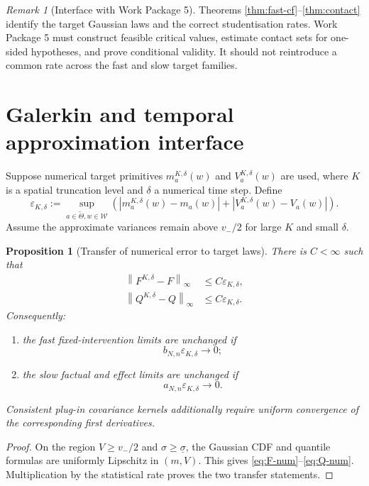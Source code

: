 \documentclass[11pt]{article}
\newtheorem{proposition}[assumption]{Proposition}
\theoremstyle{remark}
\newtheorem{remark}[assumption]{Remark}
\newcommand{\cW}{\mathcal W}
\newcommand{\norm}[1]{\left\lVert #1\right\rVert}
\newcommand{\abs}[1]{\left\lvert #1\right\rvert}
\newcommand{\an}{a_{N,n}}
\newcommand{\bn}{b_{N,n}}
\begin{document}
\begin{remark}[Interface with Work Package 5]
Theorems \ref{thm:fast-cf}--\ref{thm:contact} identify the target Gaussian laws and the correct studentisation rates.  Work Package 5 must construct feasible critical values, estimate contact sets for one-sided hypotheses, and prove conditional validity.  It should not reintroduce a common rate across the fast and slow target families.
\end{remark}

\section{Galerkin and temporal approximation interface}

Suppose numerical target primitives $m_a^{K,\delta}(w)$ and $V_a^{K,\delta}(w)$ are used, where $K$ is a spatial truncation level and $\delta$ a numerical time step.  Define
\begin{equation}\label{eq:eps-num}
 \varepsilon_{K,\delta}
 :=\sup_{a\in\widetilde\Theta,w\in\cW}
 \left(
 \abs{m_a^{K,\delta}(w)-m_a(w)}
 +\abs{V_a^{K,\delta}(w)-V_a(w)}
 \right).
\end{equation}
Assume the approximate variances remain above $v_-/2$ for large $K$ and small $\delta$.

\begin{proposition}[Transfer of numerical error to target laws]\label{prop:numerical}
There is $C<\infty$ such that
\begin{align}
 \norm{F^{K,\delta}-F}_\infty&\le C\varepsilon_{K,\delta},\label{eq:F-num}\\
 \norm{Q^{K,\delta}-Q}_\infty&\le C\varepsilon_{K,\delta}.\label{eq:Q-num}
\end{align}
Consequently:
\begin{enumerate}[label=(\roman*)]
 \item the fast fixed-intervention limits are unchanged if
 \[
 \bn\varepsilon_{K,\delta}\to0;
 \]
 \item the slow factual and effect limits are unchanged if
 \[
 \an\varepsilon_{K,\delta}\to0.
 \]
\end{enumerate}
Consistent plug-in covariance kernels additionally require uniform convergence of the corresponding first derivatives.
\end{proposition}

\begin{proof}
On the region $V\ge v_-/2$ and $\sigma\ge\underline\sigma$, the Gaussian CDF and quantile formulas are uniformly Lipschitz in $(m,V)$.  This gives \eqref{eq:F-num}--\eqref{eq:Q-num}.  Multiplication by the statistical rate proves the two transfer statements.
\end{proof}
\end{document}
